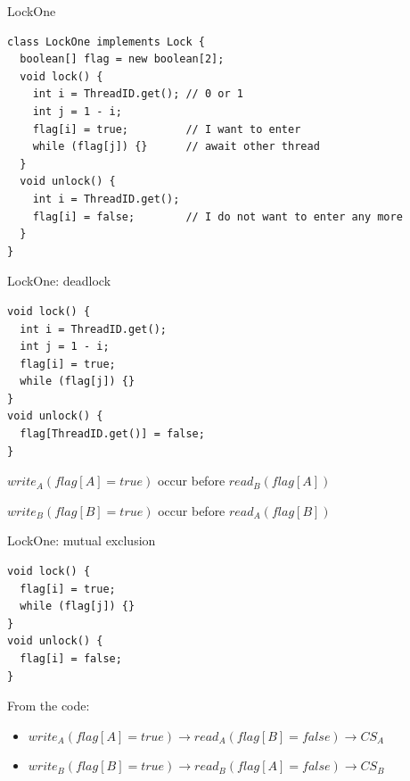 


\begin{frame}[fragile]{LockOne}

\begin{verbatim}
class LockOne implements Lock {
  boolean[] flag = new boolean[2];
  void lock() {
    int i = ThreadID.get(); // 0 or 1
    int j = 1 - i;
    flag[i] = true;         // I want to enter
    while (flag[j]) {}      // await other thread
  }
  void unlock() {
    int i = ThreadID.get();  
    flag[i] = false;        // I do not want to enter any more
  }
}
\end{verbatim}
\end{frame}

\begin{frame}[fragile]{LockOne: deadlock}

\begin{verbatim}
void lock() {
  int i = ThreadID.get();
  int j = 1 - i;
  flag[i] = true;
  while (flag[j]) {}
}
void unlock() {
  flag[ThreadID.get()] = false;
}
\end{verbatim}

$write_{A}(flag[A] = true)$ occur before $read_{B}(flag[A])$

$write_{B}(flag[B] = true)$ occur before $read_{A}(flag[B])$
\end{frame}


\begin{frame}[fragile]{LockOne: mutual exclusion}
\begin{verbatim}
void lock() {
  flag[i] = true;
  while (flag[j]) {}
}
void unlock() {
  flag[i] = false;
}
\end{verbatim}

From the code:
\begin{itemize}
  \item $write_{A}(flag[A] = true) \rightarrow read_{A}(flag[B] = false) \rightarrow CS_{A}$ 
  \item $write_{B}(flag[B] = true) \rightarrow read_{B}(flag[A] = false) \rightarrow CS_{B}$ 
\end{itemize}

\end{frame}


